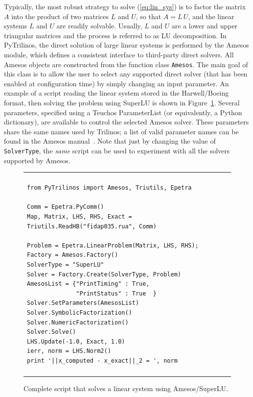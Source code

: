 \documentclass[acmtocl]{acmtrans2m}
\newcommand{\PyTrilinos}{{PyTrilinos}}
\begin{document}
\smallskip

Typically, the most robust strategy to solve (\ref{eq:lin_sys}) is to
factor the matrix $A$ into the product of two matrices $L$ and $U$, so
that $A = L \, U$, and the linear systems $L$ and $U$ are readily
solvable.  Usually, $L$ and $U$ are a lower and upper triangular
matrices and the process is referred to as LU decomposition.  In
\PyTrilinos, the direct solution of large linear systems is performed
by the Amesos module, which defines a consistent interface to
third-party direct solvers.  All Amesos objects are constructed from
the function class {\tt Amesos}.  The main goal of this class is to
allow the user to select any supported direct solver (that has been
enabled at configuration time) by simply changing an input parameter.
An example of a script reading the linear system stored in the
Harwell/Boeing format, then solving the problem using SuperLU is shown
in Figure~\ref{fig:amesos}.  Several parameters, specified using a
Teuchos ParameterList (or equivalently, a Python dictionary), are
available to control the selected Amesos solver.  These parameters
share the same names used by Trilinos; a list of valid parameter names
can be found in the Amesos manual~\cite{Amesos-Reference-Guide}.  Note
that just by changing the value of {\tt SolverType}, the {\sl same}
script can be used to experiment with all the solvers supported by
Amesos.

\begin{figure}
  \begin{center}
    \begin{tabular}{| p{12cm} |}
      \hline \\
      \footnotesize
      \begin{minipage}{11.5cm}
\begin{verbatim}
from PyTrilinos import Amesos, Triutils, Epetra

Comm = Epetra.PyComm()
Map, Matrix, LHS, RHS, Exact = Triutils.ReadHB("fidap035.rua", Comm)

Problem = Epetra.LinearProblem(Matrix, LHS, RHS);
Factory = Amesos.Factory()
SolverType = "SuperLU"
Solver = Factory.Create(SolverType, Problem)
AmesosList = {"PrintTiming" : True,
              "PrintStatus" : True  }
Solver.SetParameters(AmesosList)
Solver.SymbolicFactorization()
Solver.NumericFactorization()
Solver.Solve()
LHS.Update(-1.0, Exact, 1.0)
ierr, norm = LHS.Norm2()
print '||x_computed - x_exact||_2 = ', norm
\end{verbatim}
      \end{minipage}
      \\
      \\
      \hline
    \end{tabular}
    \caption{Complete script that solves a linear system using
      Amesos/SuperLU.}
    \label{fig:amesos}
  \end{center}
\end{figure}
\end{document}
